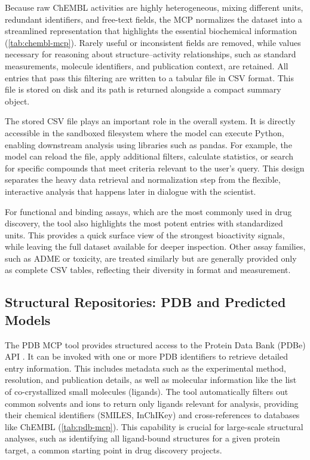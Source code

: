 \documentclass{article}
\begin{document}
Because raw ChEMBL activities are highly heterogeneous, mixing different units, redundant identifiers, and free-text fields, the MCP normalizes the dataset into a streamlined representation that highlights the essential biochemical information (\cref{tab:chembl-mcp}). Rarely useful or inconsistent fields are removed, while values necessary for reasoning about structure–activity relationships, such as standard measurements, molecule identifiers, and publication context, are retained. All entries that pass this filtering are written to a tabular file in CSV format. This file is stored on disk and its path is returned alongside a compact summary object.

The stored CSV file plays an important role in the overall system. It is directly accessible in the sandboxed filesystem where the model can execute Python, enabling downstream analysis using libraries such as pandas. For example, the model can reload the file, apply additional filters, calculate statistics, or search for specific compounds that meet criteria relevant to the user's query. This design separates the heavy data retrieval and normalization step from the flexible, interactive analysis that happens later in dialogue with the scientist.

For functional and binding assays, which are the most commonly used in drug discovery, the tool also highlights the most potent entries with standardized units. This provides a quick surface view of the strongest bioactivity signals, while leaving the full dataset available for deeper inspection. Other assay families, such as ADME or toxicity, are treated similarly but are generally provided only as complete CSV tables, reflecting their diversity in format and measurement.

\subsection{Structural Repositories: PDB and Predicted Models}\label{sec:data:pdb}
The PDB MCP tool provides structured access to the Protein Data Bank (PDBe) API \citep{Burley2018}. It can be invoked with one or more PDB identifiers to retrieve detailed entry information. This includes metadata such as the experimental method, resolution, and publication details, as well as molecular information like the list of co-crystallized small molecules (ligands). The tool automatically filters out common solvents and ions to return only ligands relevant for analysis, providing their chemical identifiers (SMILES, InChIKey) and cross-references to databases like ChEMBL (\cref{tab:pdb-mcp}). This capability is crucial for large-scale structural analyses, such as identifying all ligand-bound structures for a given protein target, a common starting point in drug discovery projects.
\end{document}
